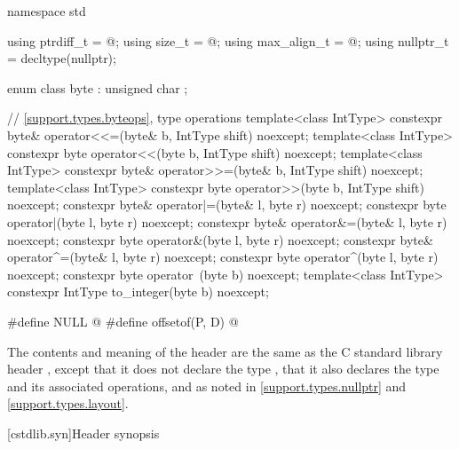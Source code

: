 %
%
%
%
%
%
%
\begin{codeblock}
namespace std {
  using ptrdiff_t = @\seebelow@;
  using size_t = @\seebelow@;
  using max_align_t = @\seebelow@;
  using nullptr_t = decltype(nullptr);

  enum class byte : unsigned char {};

  // \ref{support.types.byteops},  type operations
  template<class IntType>
    constexpr byte& operator<<=(byte& b, IntType shift) noexcept;
  template<class IntType>
    constexpr byte operator<<(byte b, IntType shift) noexcept;
  template<class IntType>
    constexpr byte& operator>>=(byte& b, IntType shift) noexcept;
  template<class IntType>
    constexpr byte operator>>(byte b, IntType shift) noexcept;
  constexpr byte& operator|=(byte& l, byte r) noexcept;
  constexpr byte operator|(byte l, byte r) noexcept;
  constexpr byte& operator&=(byte& l, byte r) noexcept;
  constexpr byte operator&(byte l, byte r) noexcept;
  constexpr byte& operator^=(byte& l, byte r) noexcept;
  constexpr byte operator^(byte l, byte r) noexcept;
  constexpr byte operator~(byte b) noexcept;
  template<class IntType>
    constexpr IntType to_integer(byte b) noexcept;
}

#define NULL @\seebelow@
#define offsetof(P, D) @\seebelow@
\end{codeblock}

\pnum
The contents and meaning of the header  are the same as
the C standard library header ,
except that it does not declare the type ,
that it also declares the type 
and its associated operations,
and as noted in
\ref{support.types.nullptr} and
\ref{support.types.layout}.


[cstdlib.syn]{Header  synopsis}

